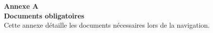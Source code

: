 \noindent
\begin{minipage}[t][\textheight][t]{0.33\textwidth}
    \colorbox{StrongBlue}{
        \parbox[c][\textheight][c]{\textwidth}{ 
            \color{OffWhite} 
            \begin{center}
                \begin{minipage}[t][0.6\textheight][c]{0.8\textwidth}
                    \begin{center}
                    {\huge \textbf{Annexe A }}\\
                    \vspace{2em}
                    {\huge \textbf{Documents obligatoires}}\\ 
                    \vspace{2em}
                    \normalsize
                    Cette annexe détaille les documents nécessaires lors de la navigation.
                    \end{center}                    
                \end{minipage}%

                \begin{minipage}[t][0.4\textheight][t]{\textwidth}
                \end{minipage}%
            \end{center}       
        }      
    }
\end{minipage}%
\begin{minipage}[c][\textheight][t]{0.07\textwidth}
\hfill
\end{minipage}%
\begin{minipage}[c][\textheight][t]{0.53\textwidth}
    \vspace{1cm}
    \color{StrongBlue}    
        
\end{minipage}%

%     
                
                    

